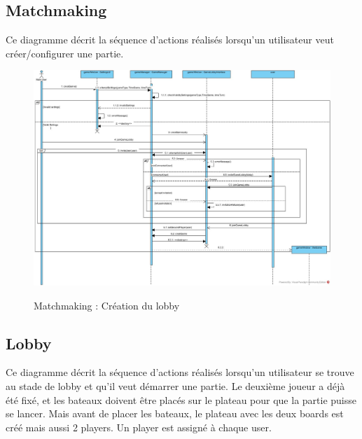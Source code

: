 \documentclass[../design_fonctionnement_sys.tex]{subfiles}
\begin{document}
\newpage

\subsection{Matchmaking}
Ce diagramme décrit la séquence d'actions réalisés lorsqu'un utilisateur veut créer/configurer une partie.

\begin{figure}[H]
    \centering
    \includegraphics[scale=0.3]{img_design/PreLoby.jpg}
    \label{fig:seq_match_client}
    \caption{Matchmaking : Création du lobby}
\end{figure}

\newpage

\subsection{Lobby}
Ce diagramme décrit la séquence d'actions réalisés lorsqu'un utilisateur se trouve au stade de lobby et qu'il veut démarrer une partie.
Le deuxième joueur a déjà été fixé, et les bateaux doivent être placés sur le plateau pour que la partie puisse se lancer.
Mais avant de placer les bateaux, le plateau avec les deux boards est créé mais aussi 2 players. Un player est assigné à chaque user.
\end{document}
